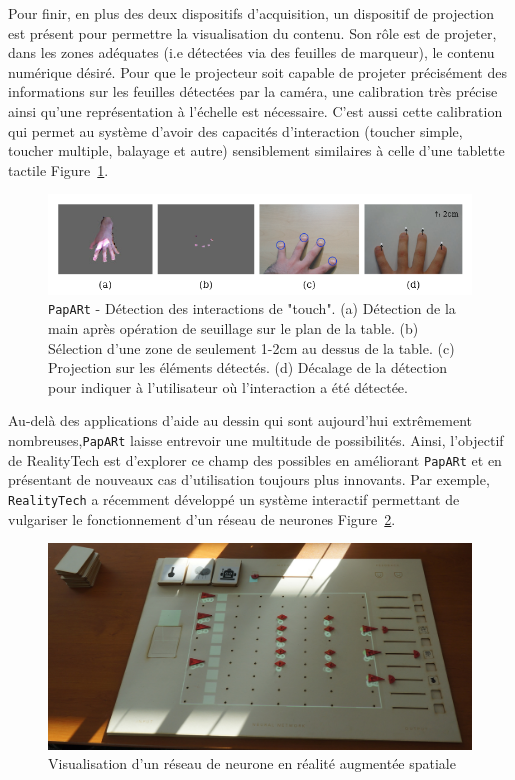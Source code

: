 Pour finir, en plus des deux dispositifs d'acquisition, un dispositif de projection est présent pour permettre la visualisation du contenu. Son rôle est de projeter, dans les zones adéquates (i.e détectées via des feuilles de marqueur), le contenu numérique désiré. Pour que le projecteur soit capable de projeter précisément des informations sur les feuilles détectées par la caméra, une calibration très précise ainsi qu'une représentation à l'échelle est nécessaire. C'est aussi cette calibration qui permet au système d'avoir des capacités d'interaction (toucher simple, toucher multiple, balayage et autre) sensiblement similaires à celle d'une tablette tactile Figure~\ref{fig:papart:touch}.


\begin{figure}[H]
\centering
\includegraphics[width=\linewidth]{images/paparttouch}
\caption{\texttt{PapARt} - Détection des interactions de "touch". (a) Détection de la main après opération de seuillage sur le plan de la table. (b) Sélection d'une zone de seulement 1-2cm au dessus de la table. (c) Projection sur les éléments détectés. (d) Décalage de la détection pour indiquer à l'utilisateur où l'interaction a été détectée.\protect\footnotemark}
\label{fig:papart:touch}
\end{figure}


Au-delà des applications d'aide au dessin qui sont aujourd'hui extrêmement nombreuses,\texttt{PapARt} laisse entrevoir une multitude de possibilités. Ainsi, l'objectif de RealityTech est d'explorer ce champ des possibles en améliorant \texttt{PapARt} et en présentant de nouveaux cas d'utilisation toujours plus innovants. Par exemple, \texttt{RealityTech} a récemment développé un système interactif permettant de vulgariser le fonctionnement d'un réseau de neurones Figure~\ref{fig:neuralnetwork}.

\begin{figure}[H]
\centering
\includegraphics[width=0.65\linewidth]{images/neural-network}
\caption{Visualisation d'un réseau de neurone en réalité augmentée spatiale\protect\footnotemark}
\label{fig:neuralnetwork}
\end{figure}


